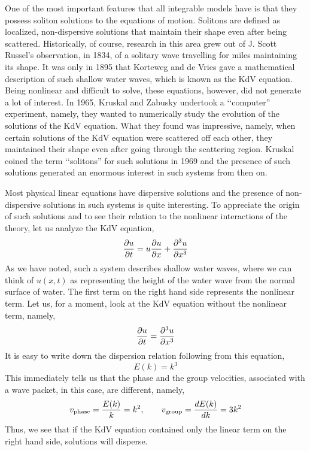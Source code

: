\documentclass[a4paper,11pt]{article}
\begin{document}
One of the most important features that all integrable models have is
that they possess soliton solutions to the equations of
motion. Solitons are defined as localized, non-dispersive solutions
that maintain their shape even after being scattered. Historically, of
course, research in this area grew out of J. Scott Russel's
observation, in 1834, of a solitary wave travelling for miles
maintaining its shape. It was only in 1895 that Korteweg and de Vries
gave a mathematical description of such shallow water waves, which is
known as the KdV equation. Being nonlinear and difficult to solve,
these equations, however, did not generate a lot of interest. In 1965,
Kruskal and Zabusky undertook a \lq\lq computer'' experiment, namely,
they wanted to numerically study the evolution of the solutions of the
KdV equation. What they found was impressive, namely, when certain
solutions of the KdV equation were scattered off each other, they
maintained their shape even after going through the scattering
region. Kruskal coined the term \lq\lq solitons'' for such solutions
in 1969 and the presence of such solutions generated an enormous
interest in such systems from then on. 


Most physical linear equations have dispersive solutions and the
presence of non-dispersive solutions in such systems is quite
interesting. To appreciate the origin of such solutions and to see
their relation to the nonlinear interactions of the theory, let us
analyze the KdV equation,
\begin{equation}
{\partial u\over \partial t} = u {\partial u\over \partial x} +
{\partial^{3} u\over \partial x^{3}}
\end{equation}
As we have noted, such a system describes shallow water waves, where
we can think of $u(x,t)$ as representing the height of the water wave
from the normal surface of water. The first term on the right hand
side represents the nonlinear term. Let us, for a moment, look at the
KdV equation without the nonlinear term, namely,
\begin{equation}
{\partial u\over \partial t} = {\partial^{3} u\over \partial x^{3}}
\end{equation}
It is easy to write down the dispersion relation following from this
equation, 
\begin{equation}
E(k) = k^{3}
\end{equation}
This immediately tells us that the phase and the group velocities,
associated with a wave packet, in this case, are different, namely,
\begin{equation}
v_{\rm phase} = {E(k)\over k} = k^{2},\qquad v_{\rm group} = {d
E(k)\over dk} = 3k^{2}
\end{equation}
Thus, we see that if the KdV equation contained only the linear term
on the right hand side, solutions will disperse.
\end{document}
